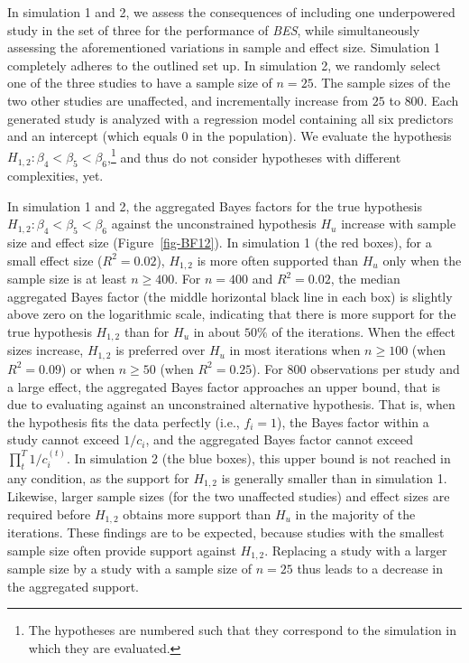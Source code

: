 \documentclass[
]{interact}
\begin{document}
In simulation 1 and 2, we assess the consequences of including one
underpowered study in the set of three for the performance of
\emph{BES}, while simultaneously assessing the aforementioned variations
in sample and effect size. Simulation 1 completely adheres to the
outlined set up. In simulation 2, we randomly select one of the three
studies to have a sample size of \(n = 25\). The sample sizes of the two
other studies are unaffected, and incrementally increase from \(25\) to
\(800\). Each generated study is analyzed with a regression model
containing all six predictors and an intercept (which equals 0 in the
population). We evaluate the hypothesis
\(H_{1,2}: \beta_4 < \beta_5 < \beta_6\),\footnote{ The hypotheses are
  numbered such that they correspond to the simulation in which they are
  evaluated.} and thus do not consider hypotheses with different
complexities, yet.

In simulation 1 and 2, the aggregated Bayes factors for the true
hypothesis \(H_{1,2}: \beta_4 < \beta_5 < \beta_6\) against the
unconstrained hypothesis \(H_u\) increase with sample size and effect
size (Figure~\ref{fig-BF12}). In simulation 1 (the red boxes), for a
small effect size (\(R^2 = 0.02\)), \(H_{1,2}\) is more often supported
than \(H_u\) only when the sample size is at least \(n \geq 400\). For
\(n = 400\) and \(R^2 = 0.02\), the median aggregated Bayes factor (the
middle horizontal black line in each box) is slightly above zero on the
logarithmic scale, indicating that there is more support for the true
hypothesis \(H_{1,2}\) than for \(H_u\) in about \(50\%\) of the
iterations. When the effect sizes increase, \(H_{1,2}\) is preferred
over \(H_u\) in most iterations when \(n \geq 100\) (when
\(R^2 = 0.09\)) or when \(n \geq 50\) (when \(R^2 = 0.25\)). For \(800\)
observations per study and a large effect, the aggregated Bayes factor
approaches an upper bound, that is due to evaluating against an
unconstrained alternative hypothesis. That is, when the hypothesis fits
the data perfectly (i.e., \(f_i = 1\)), the Bayes factor within a study
cannot exceed \(1/c_i\), and the aggregated Bayes factor cannot exceed
\(\prod_t^T 1/c_i^{(t)}\). In simulation 2 (the blue boxes), this upper
bound is not reached in any condition, as the support for \(H_{1,2}\) is
generally smaller than in simulation 1. Likewise, larger sample sizes
(for the two unaffected studies) and effect sizes are required before
\(H_{1,2}\) obtains more support than \(H_u\) in the majority of the
iterations. These findings are to be expected, because studies with the
smallest sample size often provide support against \(H_{1,2}\).
Replacing a study with a larger sample size by a study with a sample
size of \(n = 25\) thus leads to a decrease in the aggregated support.
\end{document}
